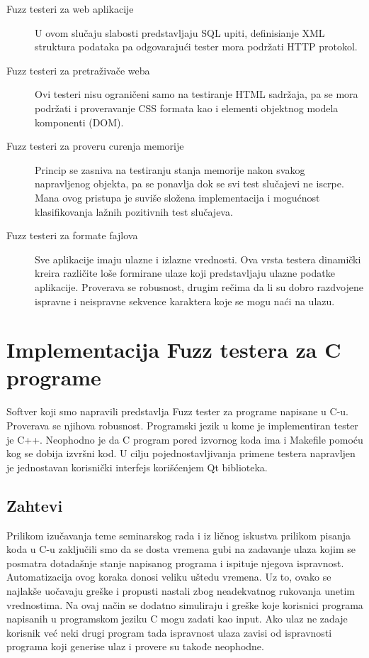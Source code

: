 \documentclass[a4paper]{article}
\begin{document}
{\begin{description}
\item[Fuzz testeri za web aplikacije] 
U ovom slučaju slabosti predstavljaju SQL upiti, definisianje XML struktura podataka pa odgovarajući tester mora podržati HTTP protokol.
\\

\item[Fuzz testeri za pretraživače weba]
Ovi testeri nisu ograničeni samo na testiranje HTML sadržaja, pa se mora podržati i proveravanje CSS formata kao i elementi objektnog modela komponenti (DOM).
\\

\item[Fuzz testeri za proveru curenja memorije]
Princip se zasniva na testiranju stanja memorije nakon svakog napravljenog objekta, pa se ponavlja dok se svi test slučajevi ne iscrpe. Mana ovog pristupa je suviše složena implementacija i mogućnost klasifikovanja lažnih pozitivnih test slučajeva.
\\

\item[Fuzz testeri za formate fajlova]
Sve aplikacije imaju ulazne i izlazne vrednosti. Ova vrsta testera
dinamički kreira različite loše formirane ulaze koji predstavljaju ulazne podatke aplikacije. Proverava se robusnost, drugim rečima da li su dobro 
razdvojene ispravne i neispravne sekvence karaktera koje se mogu naći na ulazu.
\end{description}

\section{Implementacija Fuzz testera za C programe}
\label{sec:implementacija_fuzz_testera}

Softver koji smo napravili predstavlja Fuzz tester za programe napisane u C-u. Proverava se njihova robusnost. Programski jezik u kome je implementiran tester je C++. Neophodno je da C program pored izvornog koda ima i Makefile pomoću kog se dobija izvršni kod. U cilju pojednostavljivanja primene testera napravljen je jednostavan korisnički interfejs korišćenjem Qt biblioteka. 

\subsection{Zahtevi}
\label{subsec:zahtevi_testera}

Prilikom izučavanja teme seminarskog rada i iz ličnog iskustva prilikom pisanja koda u C-u zaključili smo da se dosta vremena gubi na zadavanje ulaza kojim se posmatra dotadašnje stanje napisanog programa i ispituje njegova ispravnost. Automatizacija ovog koraka donosi veliku uštedu vremena. Uz to, ovako se najlakše uočavaju greške i propusti nastali zbog neadekvatnog rukovanja unetim vrednostima. Na ovaj način se dodatno simuliraju i greške koje korisnici programa napisanih u programskom jeziku C mogu zadati kao input. Ako ulaz ne zadaje korisnik već neki drugi program tada ispravnost ulaza zavisi od ispravnosti programa koji generise ulaz i provere su takođe neophodne.\\

}
\end{document}
